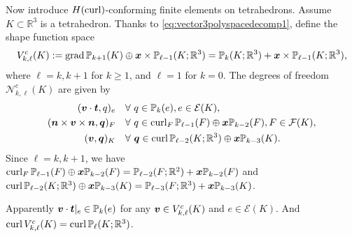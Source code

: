 Now introduce $H(\operatorname{curl})$-conforming finite elements on tetrahedrons.
Assume $K\subset \mathbb R^3$ is a tetrahedron.
Thanks to \eqref{eq:vector3polyspacedecomp1}, define the shape function space
\[
V_{k,\ell}^c(K):=\operatorname{grad}\mathbb P_{k+1}(K)\oplus \boldsymbol x\times\mathbb P_{\ell-1}(K; \mathbb R^3)=\mathbb P_{k}(K; \mathbb R^3) + \boldsymbol x\times\mathbb P_{\ell-1}(K; \mathbb R^3),
\]
where $\ell=k, k+1$ for $k\geq1$, and $\ell=1$ for $k=0$. 
The degrees of freedom $\mathcal N_{k,\ell}^c(K)$ are given by
\begin{align}
(\boldsymbol v\cdot\boldsymbol t, q)_e & \quad\forall~q\in\mathbb P_{k}(e),  e\in\mathcal E(K),\label{Hcurlfem3ddof1}\\
(\boldsymbol n\times\boldsymbol v\times\boldsymbol  n, \boldsymbol q)_F & \quad\forall~q\in\operatorname{curl}_F\mathbb P_{
\ell-1}(F)\oplus\boldsymbol x\mathbb P_{k-2}(F),  F\in\mathcal F(K),\label{Hcurlfem3ddof2}\\
(\boldsymbol v, \boldsymbol q)_K & \quad\forall~\boldsymbol q\in\operatorname{curl}\mathbb P_{\ell-2}(K; \mathbb R^3)\oplus\boldsymbol x\mathbb P_{k-3}(K). \label{Hcurlfem3ddof3}
\end{align}
Since $\ell=k, k+1$, we have $\operatorname{curl}_F\mathbb P_{
\ell-1}(F)\oplus\boldsymbol x\mathbb P_{k-2}(F)=\mathbb P_{
\ell-2}(F;\mathbb R^2)+\boldsymbol x\mathbb P_{k-2}(F)$ and $\operatorname{curl}\mathbb P_{\ell-2}(K; \mathbb R^3)\oplus\boldsymbol x\mathbb P_{k-3}(K)=\mathbb P_{
\ell-3}(F;\mathbb R^3)+\boldsymbol x\mathbb P_{k-3}(K)$.

Apparently $\boldsymbol v\cdot \boldsymbol t|_e\in\mathbb P_{k}(e)$ for any $\boldsymbol v\in V_{k,\ell}^c(K)$ and $e\in\mathcal E(K)$.
And $\operatorname{curl} V_{k,\ell}^c(K)=\operatorname{curl}\mathbb P_{\ell}(K;\mathbb R^3)$.




